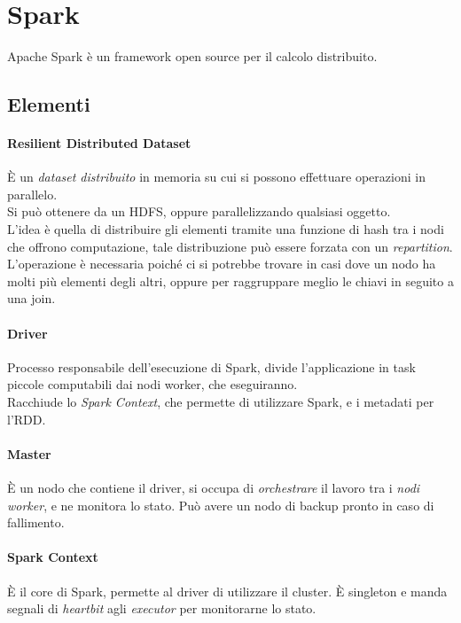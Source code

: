\section{Spark}
Apache Spark è un framework open source per il calcolo distribuito.

\subsection{Elementi}
\paragraph{Resilient Distributed Dataset}
È un \emph{dataset distribuito} in memoria su cui si possono effettuare operazioni in parallelo.\\
Si può ottenere da un HDFS, oppure parallelizzando qualsiasi oggetto.\\
L'idea è quella di distribuire gli elementi tramite una funzione di hash tra i nodi 
che offrono computazione, tale distribuzione può essere forzata con un \emph{repartition}.\\
L'operazione è necessaria poiché ci si potrebbe trovare in casi dove un nodo ha molti più 
elementi degli altri, oppure per raggruppare meglio le chiavi in seguito a una join.

\paragraph{Driver}
Processo responsabile dell'esecuzione di Spark, divide l'applicazione in task piccole
computabili dai nodi worker, che eseguiranno.\\
Racchiude lo \emph{Spark Context}, che permette di utilizzare Spark, e i metadati per l'RDD.

\paragraph{Master}
È un nodo che contiene il driver, si occupa di \emph{orchestrare} il lavoro tra i \emph{nodi worker}, 
e ne monitora lo stato. Può avere un nodo di backup pronto in caso di fallimento.

\paragraph{Spark Context}
È il core di Spark, permette al driver di utilizzare il cluster. È singleton e manda segnali 
di \emph{heartbit} agli \emph{executor} per monitorarne lo stato.

